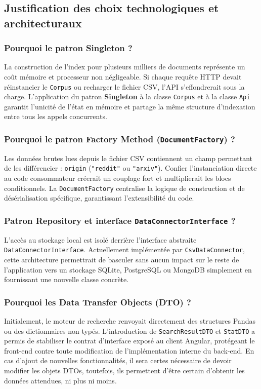 \documentclass[12pt,a4paper]{article}
\begin{document}
\subsection{Justification des choix technologiques et architecturaux}

\subsubsection{Pourquoi le patron Singleton ?}
La construction de l'index pour plusieurs milliers de documents représente un coût mémoire et processeur non négligeable. Si chaque requête HTTP devait réinstancier le \texttt{Corpus} ou recharger le fichier CSV, l'API s'effondrerait sous la charge. L'application du patron \textbf{Singleton} à la classe \texttt{Corpus} et à la classe \texttt{Api} garantit l'unicité de l'état en mémoire et partage la même structure d'indexation entre tous les appels concurrents.

\subsubsection{Pourquoi le patron Factory Method (\texttt{DocumentFactory}) ?}
Les données brutes lues depuis le fichier CSV contiennent un champ permettant de les différencier : \texttt{origin} (\texttt{"reddit"} ou \texttt{"arxiv"}). Confier l'instanciation directe au code consommateur créerait un couplage fort et multiplierait les blocs conditionnels. La \texttt{DocumentFactory} centralise la logique de construction et de désérialisation spécifique, garantissant l'extensibilité du code.

\subsubsection{Patron Repository et interface \texttt{DataConnectorInterface} ?}
L'accès au stockage local est isolé derrière l'interface abstraite \texttt{DataConnectorInterface}. Actuellement implémentée par \texttt{CsvDataConnector}, cette architecture permettrait de basculer sans aucun impact sur le reste de l'application vers un stockage SQLite, PostgreSQL ou MongoDB simplement en fournissant une nouvelle classe concrète.

\subsubsection{Pourquoi les Data Transfer Objects (DTO) ?}
Initialement, le moteur de recherche renvoyait directement des structures Pandas ou des dictionnaires non typés. L'introduction de \texttt{SearchResultDTO} et \texttt{StatDTO} a permis de stabiliser le contrat d'interface exposé au client Angular, protégeant le front-end contre toute modification de l'implémentation interne du back-end. En cas d'ajout de nouvelles fonctionnalités, il sera certes nécessaire de devoir modifier les objets DTOs, toutefois, ils permettent d'être certain d'obtenir les données attendues, ni plus ni moins.
\end{document}
